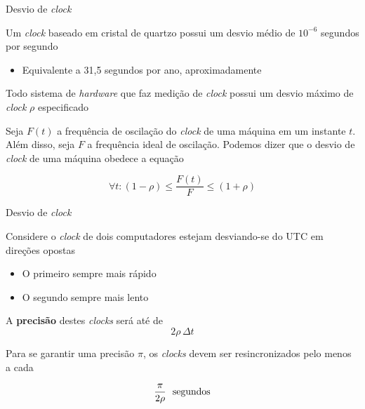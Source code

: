 \documentclass[compress]{beamer}
\begin{document}
\begin{frame}{Desvio de \textit{clock}}

Um \textit{clock} baseado em cristal de quartzo possui um desvio médio de $10^{-6}$ segundos por segundo
\begin{itemize}
    \item Equivalente a 31,5 segundos por ano, aproximadamente
\end{itemize}

Todo sistema de \textit{hardware} que faz medição de \textit{clock} possui um desvio máximo de \textit{clock} $\rho$ especificado

Seja $F(t)$ a frequência de oscilação do \textit{clock} de uma máquina em um instante $t$. Além disso, seja $F$ a frequência ideal de oscilação. Podemos dizer que o desvio de \textit{clock} de uma máquina obedece a equação

$$
\forall t: (1 - \rho) \leq \frac{F(t)}{F} \leq (1 + \rho)
$$
\end{frame}


\begin{frame}{Desvio de \textit{clock}}

Considere o \textit{clock} de dois computadores estejam desviando-se do UTC em direções opostas
\begin{itemize}
    \item O primeiro sempre mais rápido
    \item O segundo sempre mais lento
\end{itemize}

A \textbf{precisão} destes \textit{clocks} será até de 
$$
2\rho\,\Delta t
$$

Para se garantir uma precisão $\pi$, os \textit{clocks} devem ser resincronizados pelo menos a cada 

$$
\frac{\pi}{2\rho}~~\textnormal{segundos}
$$
\end{frame}

\end{document}
